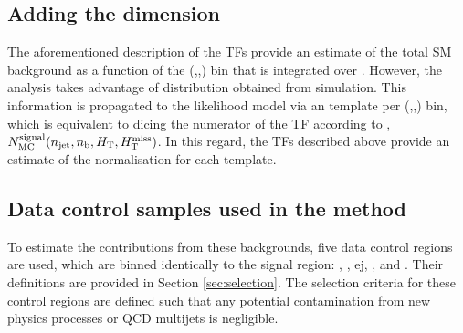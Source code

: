 \clearpage

\subsection{Adding the \mht dimension}

The aforementioned description of the TFs provide an estimate of the
total SM background as a function of the (\njet,\nb,\HT) bin that is
integrated over \mht. However, the analysis takes advantage of \mht
distribution obtained from simulation. This information is propagated
to the likelihood model via an \mht template per (\njet,\nb,\HT) bin,
which is equivalent to dicing the numerator of the TF according to
\mht, \ie $N_{\rm MC}^{\rm signal}(n_{\text{jet}},n_{\text{b}},\mbox{$H_\text{T}$},\mbox{$H_{\rm T}^{\rm miss}$})$. In this
regard, the TFs described above provide an estimate of the
normalisation for each \mht template.

\subsection{Data control samples used in the method}

To estimate the contributions from these backgrounds, five data
control regions are used, which are binned identically to the signal
region: \mj, \mmj, ej, \eej, and \gj. Their definitions are provided
in Section \ref{sec:selection}. The selection criteria for these
control regions are defined such that any potential contamination from
new physics processes or QCD multijets is negligible.

